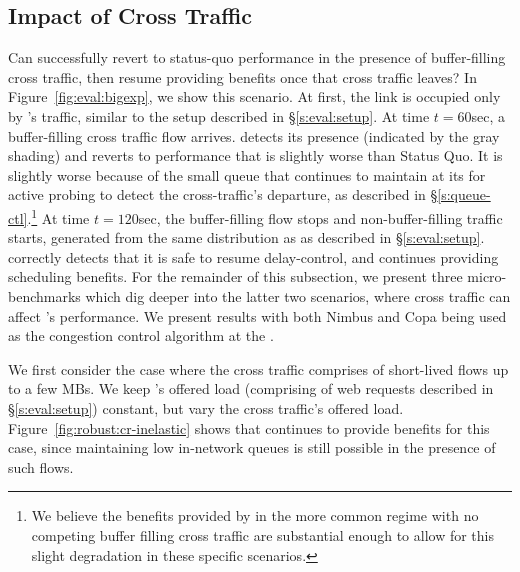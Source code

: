 \subsection{Impact of Cross Traffic}\label{s:robust:cross}


Can \name successfully revert to status-quo performance in the presence of buffer-filling cross traffic, then resume providing benefits once that cross traffic leaves?
In Figure~\ref{fig:eval:bigexp}, we show this scenario.
At first, the link is occupied only by \name's traffic, similar to the setup described in \S\ref{s:eval:setup}.
At time $t=60$sec, a buffer-filling cross traffic flow arrives.
\name detects its presence (indicated by the gray shading) and reverts to performance that is slightly worse than Status Quo. It is slightly worse because of the small queue that \name continues to maintain at its \inbox for active probing to detect the cross-traffic's departure, as described in \S\ref{s:queue-ctl}.\footnote{We believe the benefits provided by \name in the more common regime with no competing buffer filling cross traffic are substantial enough to allow for this slight degradation in these specific scenarios.}  
At time $t=120$sec, the buffer-filling flow stops and non-buffer-filling traffic starts, generated from the same distribution as \name as described in \S\ref{s:eval:setup}.
\name correctly detects that it is safe to resume delay-control, and continues providing scheduling benefits.
For the remainder of this subsection, we present three micro-benchmarks which dig deeper into the latter two scenarios, where cross traffic can affect \name's performance. 
We present results with both Nimbus and Copa being used as the congestion control algorithm at the \inbox.


 We first consider the case where the cross traffic comprises of short-lived flows up to a few MBs.
We keep \name's offered load (comprising of web requests described in \S\ref{s:eval:setup}) constant, but vary the cross traffic's offered load.
Figure~\ref{fig:robust:cr-inelastic} shows that \name continues to provide benefits for this case, since maintaining low in-network queues is still possible in the presence of such flows.

